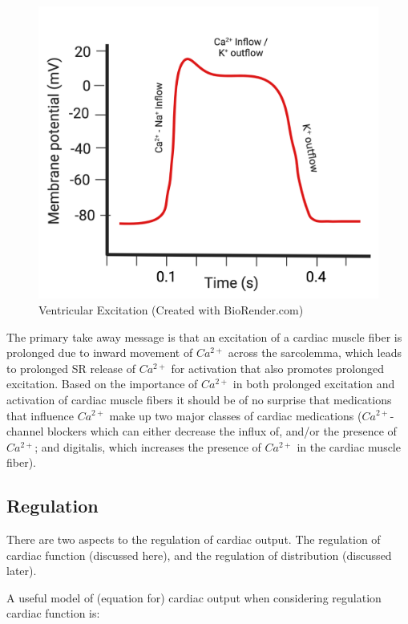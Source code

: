 \begin{figure}[!h]
    \centering
    \includegraphics[width=1\linewidth]{./figure/Cardiac_Ventricular_AP.png}
    \caption{Ventricular Excitation \footnotesize{(Created with BioRender.com)}}
    \label{fig:Cardiac_Ventricular_AP}
\end{figure}

The primary take away message is that an excitation of a cardiac muscle fiber is prolonged due to inward movement of $Ca^{2+}$ across the sarcolemma, which leads to prolonged SR release of $Ca^{2+}$ for activation that also promotes prolonged excitation. Based on the importance of $Ca^{2+}$ in both prolonged excitation and activation of cardiac muscle fibers it should be of no surprise that medications that influence $Ca^{2+}$ make up two major classes of cardiac medications ($Ca^{2+}$-channel blockers which can either decrease the influx of, and/or the presence of $Ca^{2+}$; and digitalis, which increases the presence of $Ca^{2+}$ in the cardiac muscle fiber).


\subsection{Regulation}

There are two aspects to the regulation of cardiac output. The regulation of cardiac function (discussed here), and the regulation of distribution (discussed later).

A useful model of (equation for) cardiac output when considering regulation cardiac function is: 

